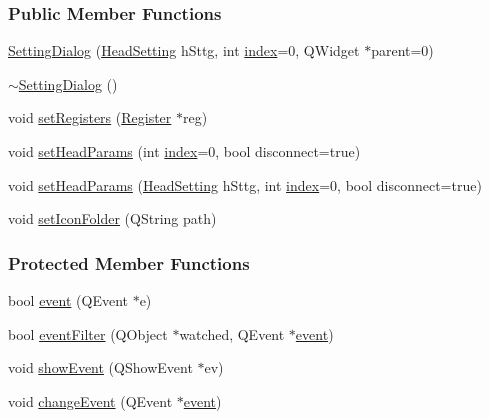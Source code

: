 \subsubsection*{Public Member Functions}
\begin{DoxyCompactItemize}
\item 
\mbox{\hyperlink{classSettingDialog_ab7c9f7de85d73ca64b847ca3a0cd422a}{Setting\+Dialog}} (\mbox{\hyperlink{classHeadSetting}{Head\+Setting}} h\+Sttg, int \mbox{\hyperlink{classSettingDialog_a293670a08207442bb9ab04a734b70d33}{index}}=0, Q\+Widget $\ast$parent=0)
\item 
\mbox{\hyperlink{classSettingDialog_a9bfa278550d23df3f5e944989b0b0f54}{$\sim$\+Setting\+Dialog}} ()
\item 
void \mbox{\hyperlink{classSettingDialog_a43114394546e14f2a5c140591708b53d}{set\+Registers}} (\mbox{\hyperlink{classRegister}{Register}} $\ast$reg)
\item 
void \mbox{\hyperlink{classSettingDialog_a3ab742273bba41f566e2ec5e23e15adf}{set\+Head\+Params}} (int \mbox{\hyperlink{classSettingDialog_a293670a08207442bb9ab04a734b70d33}{index}}=0, bool disconnect=true)
\item 
void \mbox{\hyperlink{classSettingDialog_a25e9a36fc58d6cc9ae3fa63ff323d139}{set\+Head\+Params}} (\mbox{\hyperlink{classHeadSetting}{Head\+Setting}} h\+Sttg, int \mbox{\hyperlink{classSettingDialog_a293670a08207442bb9ab04a734b70d33}{index}}=0, bool disconnect=true)
\item 
void \mbox{\hyperlink{classSettingDialog_a47c392fce9b4379ee287f94ee13add91}{set\+Icon\+Folder}} (Q\+String path)
\end{DoxyCompactItemize}
\subsubsection*{Protected Member Functions}
\begin{DoxyCompactItemize}
\item 
bool \mbox{\hyperlink{classSettingDialog_a8946ea3396791c3bfdb0af9294432456}{event}} (Q\+Event $\ast$e)
\item 
bool \mbox{\hyperlink{classSettingDialog_aced29131c09a6a91867bd3d6b05f01dc}{event\+Filter}} (Q\+Object $\ast$watched, Q\+Event $\ast$\mbox{\hyperlink{classSettingDialog_a8946ea3396791c3bfdb0af9294432456}{event}})
\item 
void \mbox{\hyperlink{classSettingDialog_aaed08f2ad87702c7d6ff0a4a5df7e1e7}{show\+Event}} (Q\+Show\+Event $\ast$ev)
\item 
void \mbox{\hyperlink{classSettingDialog_a7aa0c7f2703bd6d208570eb7ed98e47b}{change\+Event}} (Q\+Event $\ast$\mbox{\hyperlink{classSettingDialog_a8946ea3396791c3bfdb0af9294432456}{event}})
\end{DoxyCompactItemize}
